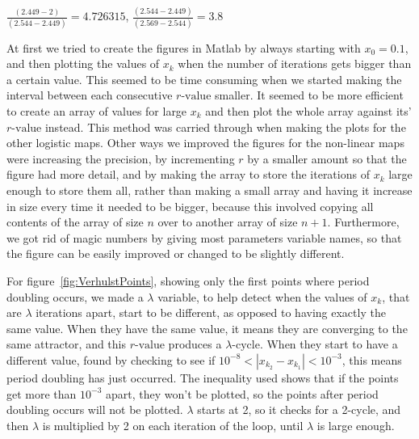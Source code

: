 \documentclass[a4wide, 10pt]{article}
\begin{document}
\begin{center} 	  
   	  $\frac{(2.449-2)}{(2.544-2.449)} = 4.726315$, $\frac{(2.544-2.449)}{(2.569-2.544)} = 3.8$ 
\end{center}
 
At first we tried to create the figures in Matlab by always starting with $x_{0} = 0.1$, and then plotting the values of $x_{k}$
  when the number of iterations gets bigger than a certain value. This seemed to be time 
   consuming when we started making the interval between each consecutive $r \textrm{-value}$ smaller. It seemed 
    to be more efficient to create an array of values for large $x_{k}$ and then plot the whole 
     array against its' $r \textrm{-value}$ instead. 
       This method was carried through when making the plots for the other logistic maps. Other ways we 
 improved the figures for the non-linear maps were increasing the precision, by incrementing $r$ by a
  smaller amount so that the figure had more detail, and by making the array to store the iterations of
   $x_{k}$ large enough to store them all, rather than making a small array and having it increase in
    size every time it needed to be bigger, because this involved copying all contents of the array of
     size $n$ over to another array of size $n + 1$. Furthermore, we got rid of magic numbers by giving
      most parameters variable names, so that the figure can be easily improved or changed to be
       slightly different.
       
For figure~\ref{fig:VerhulstPoints}, showing only the first points where period doubling occurs, we made a $\lambda$
 variable, to help detect when the values of $x_{k}$, that are $\lambda$ iterations apart, start to be
  different, as opposed to having exactly the same value. When they have the same value, it means
   they are converging to the same attractor, and this $r \textrm{-value}$ produces a $\lambda \textrm{-cycle}$. When they start to have a different value, found by
    checking to see if $10^{-8} < |x_{k_{2}} - x_{k_{1}}| < 10^{-3}$, this means period doubling has
     just occurred. The inequality used shows that if the points get more than $10^{-3}$ apart, they
      won't be plotted, so the points after period doubling occurs will not be plotted. $\lambda$ starts at 2, so it checks for a 2-cycle, and then $\lambda$ is multiplied by 2 on each iteration of the loop, until $\lambda$ is large enough.
 
\end{document}
